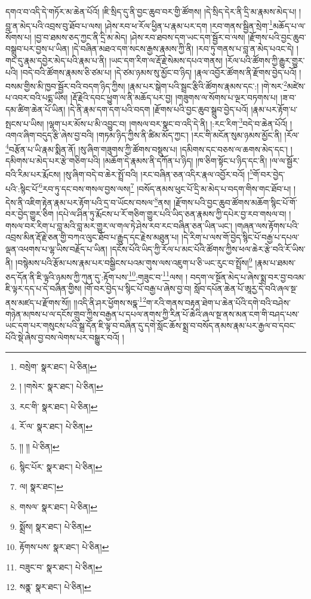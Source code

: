 དགའ་བ་འདི་དེ་གཏོར་མ་ཆེན་པོའོ། །ཇི་སྲིད་དུ་ནི་བྱང་ཆུབ་བར་གྱི་ཚོགས། །དེ་སྲིད་དེར་ནི་དྲི་མ་རྣམས་མེད་པ། །བླ་ན་མེད་པའི་འབྲས་བུ་ཐོབ་པ་ལས། །ཤེས་རབ་ཕ་རོལ་ཕྱིན་པ་རྣམ་པར་དག །རབ་གནས་སྦྱིན་སྲེག་\footnote{བསྲེག་  སྣར་ཐང་།  པེ་ཅིན། }མཆོད་པ་ལ་སོགས་པ། །བྱ་བ་ཐམས་ཅད་ཀྱང་ནི་དྲི་མ་མེད། །ཤེས་རབ་ཐབས་དག་ཡང་དག་སྦྱོར་བ་ལས། །རྫོགས་པའི་བྱང་ཆུབ་བསྒྲུབ་པར་བྱས་པ་ཡིན། །དེ་བཞིན་མཐའ་དག་སངས་རྒྱས་རྣམས་ཀྱི་ནི། །རབ་ཏུ་གནས་པ་བླ་ན་མེད་པའང་དེ། །གང་དུ་རྣམ་དབྱེར་མེད་པའི་རྣམ་པ་ནི། །ཡང་དག་རིག་ལ་རྡོ་རྗེ་སེམས་དཔའ་གནས། །རོལ་པའི་ཚོགས་ཀྱི་རྒྱུར་གྱུར་པའི། །བདེ་བའི་ཚོགས་རྣམས་ཅི་ཙམ་པ། །དེ་ཙམ་ཉམས་སུ་མྱོང་བ་ཉིད། །རྣལ་འབྱོར་ཚོགས་ནི་རྫོགས་བྱེད་པའོ། །བསམ་གྱིས་མི་ཁྱབ་སྦྱོར་བའི་བདག་ཉིད་ཀྱིས། །རྣམ་པར་སྒེག་པའི་སྦྲང་རྩིའི་ཚོགས་རྣམས་དང་:། །གེ་སར་\footnote{། །གསེར་  སྣར་ཐང་།  པེ་ཅིན། }མཛེས་པ་འབར་བའི་པདྨ་ཡིས། །རྡོ་རྗེའི་དབང་ཕྱུག་ལ་ནི་མཆོད་པར་བྱ། །གཟུགས་ལ་སོགས་པ་ལྔར་བཏགས་པ། །ཟ་བ་དམ་ཚིག་ཆེན་པོ་ཡིན། །དེ་ནི་རྣམ་དག་དག་པའི་བདག །རྫོགས་པའི་བྱང་ཆུབ་སྒྲུབ་བྱེད་པའོ། །རྣམ་པར་རྟོག་པ་སྤངས་པ་ཡིས། །ལྷག་པར་མོས་པ་མི་འབྱུང་བ། །གསལ་བར་སྣང་བ་འདི་དེ་ནི། །:རང་རིག་\footnote{རང་གི་  སྣར་ཐང་།  པེ་ཅིན། }བདེ་བ་ཆེན་པོའོ། །འགའ་ཞིག་བདུད་རྩི་ཞེས་བྱ་བའི། །གཏམ་ཉིད་ཀྱིས་ནི་ཚིམ་མོད་ཀྱང་། །རང་གི་མངོན་སུམ་ཉམས་མྱོང་ནི། །རོལ་\footnote{རོ་ལ་  སྣར་ཐང་།  པེ་ཅིན། }བརྩོན་པ་ཡི་རྣམ་སྨིན་ནོ། །སུ་ཞིག་གཟུགས་ཀྱི་ཚོགས་བསྡུས་པ། །དམིགས་དང་བཅས་ལ་ཆགས་མེད་དང་། །དམིགས་པ་མེད་པར་རྩེ་གཅིག་པའི། །མཆོག་དེ་རྣམས་ནི་དཀོན་པ་ཉིད། །ཁ་ཅིག་སྟོང་པ་ཉིད་དང་ནི། །ལ་ལ་སྦྱོར་བའི་རིམ་པར་རྨོངས། །སུ་ཞིག་བདེ་བ་ཆེར་སྤྲོ་བའི། །རང་བཞིན་ཅན་འདིར་རྣལ་འབྱོར་བའོ། །\footnote{།། །།  པེ་ཅིན། }གོ་བར་བྱེད་པའི་:སྙིང་པོ་\footnote{སྙིང་པོར་  སྣར་ཐང་།  པེ་ཅིན། }རབ་ཏུ་དང་བས་གསལ་བྱས་ལས།\footnote{ལ།  སྣར་ཐང་། } །བསོད་ནམས་ཕུང་པོ་དྲི་མ་མེད་པ་བདག་གིས་གང་ཐོབ་པ། །དེས་ནི་འཇིག་རྟེན་རྣམ་པར་རྟོག་པའི་དྲ་བ་ཡོངས་བསལ་\footnote{གསལ་  སྣར་ཐང་།  པེ་ཅིན། }ནས། །རྫོགས་པའི་བྱང་ཆུབ་ཚོགས་མཆོག་སྙིང་པོ་གོ་བར་བྱེད་གྱུར་ཅིག །དཔེ་ལ་ཤིན་ཏུ་རྨོངས་པ་རོ་གཅིག་གྱུར་པའི་ཡིད་ཅན་རྣམས་ཀྱི་དཔེར་བྱ་རབ་གསལ་བ། །གསལ་བར་རིག་པ་བླ་མའི་བླ་མར་གྱུར་ལ་གལ་ཏེ་ཤེས་རབ་རང་བཞིན་ཅན་ཡིན་ཡང་། །གཞན་ལས་རྟོགས་པའི་འབྲས་མིན་རྡོ་རྗེ་ཅན་གྱི་བཀའ་ལུང་ཐོབ་པ་རྒྱུད་དང་རྗེས་མཐུན་པ། །དེ་རིག་པ་ལས་གོ་བྱེད་སྙིང་པོ་བརྒྱ་པ་དཔལ་ལྡན་འཕགས་པ་ལྷ་ཡིས་བརྗོད་པ་ཡིན། །དངོས་པོའི་ཡིད་ཀྱི་རོལ་པ་མང་པོའི་ཚོགས་ཀྱིས་ཕལ་ཆེར་རྩེ་བའི་རོ་ཡིས་ནི། །བསྙེམས་པའི་རྩོམ་པས་རྣམ་པར་བསྒྱིངས་པའམ་གུས་ལས་འཇུག་པ་ཅི་ཡང་རུང་བ་སྤྲོས།\footnote{སྨྲོས།  སྣར་ཐང་།  པེ་ཅིན། } །རྣམ་པ་ཐམས་ཅད་དོན་ནི་ཇི་ལྟའི་ཉམས་ཀྱི་ཀུན་དུ་:རྟོག་པས་\footnote{རྟོགས་པས་  སྣར་ཐང་།  པེ་ཅིན། }:གཟུང་བ་\footnote{བཟུང་བ་  སྣར་ཐང་།  པེ་ཅིན། }ལས། །
བདག་ལ་སྔོན་མེད་པ་ཞེས་སྨྲ་བར་བྱ་བའམ་ཇི་ལྟར་དད་པ་དེ་བཞིན་གྱིས། །གོ་བར་བྱེད་པ་སྙིང་པོ་བརྒྱ་པ་ཞེས་བྱ་བ། སློབ་དཔོན་ཆེན་པོ་ཨཱརྱ་དེ་བའི་ཞལ་སྔ་ནས་མཛད་པ་རྫོགས་སོ།། །།འདི་ནི་ཤར་ཕྱོགས་སདྣ་\footnote{སནྣ་  སྣར་ཐང་།  པེ་ཅིན། }ག་རའི་གནས་བརྟན་ཐེག་པ་ཆེན་པོའི་དགེ་བའི་བཤེས་གཉེན་མཁས་པ་ལ་དངོས་གྲུབ་ཀྱིས་བརྒྱན་པ་དཔལ་ནགས་ཀྱི་རིན་པོ་ཆེའི་ཞལ་སྔ་ནས་མན་ངག་གི་བཤད་པས་ཡང་དག་པར་གསུངས་པའི་སྒྲ་དོན་ཇི་ལྟ་བ་བཞིན་དུ་དགེ་སློང་ཆོས་སྨྲ་བ་བསོད་ནམས་རྣམ་པར་རྒྱལ་བ་དབང་པོའི་སྡེ་ཞེས་བྱ་བས་ལེགས་པར་བསྒྱུར་བའོ། ། 